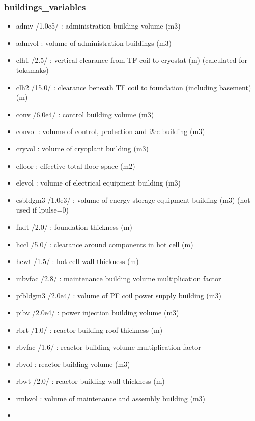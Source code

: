 \documentclass[]{article}
\providecommand{\tightlist}{%
  \setlength{\itemsep}{0pt}\setlength{\parskip}{0pt}}
\begin{document}
\subsubsection{\texorpdfstring{\href{buildings_variables.html}{buildings\_variables}}{buildings\_variables}}\label{buildings_variables}

\begin{itemize}
\tightlist
\item
  admv /1.0e5/ : administration building volume (m3)
\item
  admvol : volume of administration buildings (m3)
\item
  clh1 /2.5/ : vertical clearance from TF coil to cryostat (m)
  (calculated for tokamaks)
\item
  clh2 /15.0/ : clearance beneath TF coil to foundation (including
  basement) (m)
\item
  conv /6.0e4/ : control building volume (m3)
\item
  convol : volume of control, protection and i\&c building (m3)
\item
  cryvol : volume of cryoplant building (m3)
\item
  efloor : effective total floor space (m2)
\item
  elevol : volume of electrical equipment building (m3)
\item
  esbldgm3 /1.0e3/ : volume of energy storage equipment building (m3)
  (not used if lpulse=0)
\item
  fndt /2.0/ : foundation thickness (m)
\item
  hccl /5.0/ : clearance around components in hot cell (m)
\item
  hcwt /1.5/ : hot cell wall thickness (m)
\item
  mbvfac /2.8/ : maintenance building volume multiplication factor
\item
  pfbldgm3 /2.0e4/ : volume of PF coil power supply building (m3)
\item
  pibv /2.0e4/ : power injection building volume (m3)
\item
  rbrt /1.0/ : reactor building roof thickness (m)
\item
  rbvfac /1.6/ : reactor building volume multiplication factor
\item
  rbvol : reactor building volume (m3)
\item
  rbwt /2.0/ : reactor building wall thickness (m)
\item
  rmbvol : volume of maintenance and assembly building (m3)
\item

\end{itemize}
\end{document}
